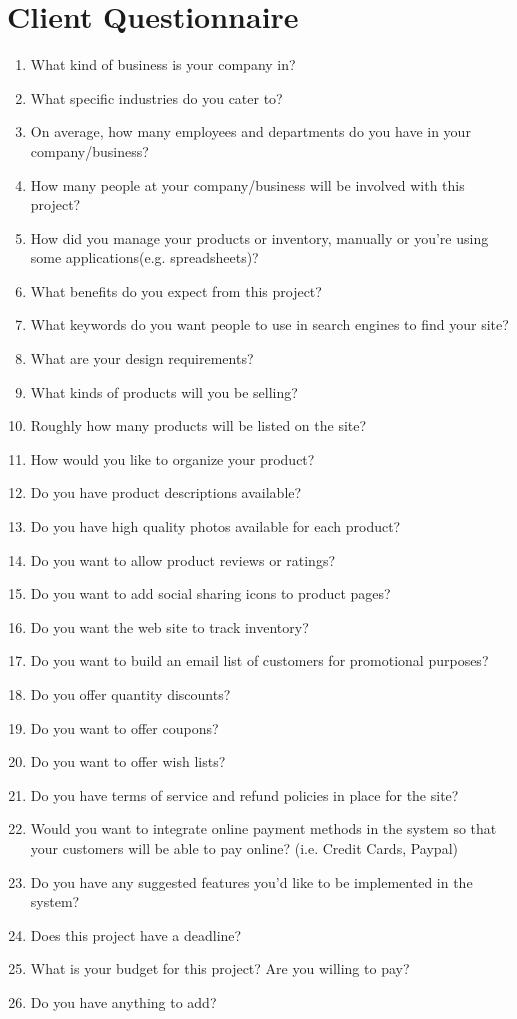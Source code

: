 \documentclass{report}
\begin{document}
\section{Client Questionnaire}
\begin{enumerate}
\item What kind of business is your company in?
\item What specific industries do you cater to?
\item On average, how many employees and departments do you have in your
company/business?
\item How many people at your company/business will be involved with this project?
\item How did you manage your products or inventory, manually or you're using some
applications(e.g. spreadsheets)?
\item What benefits do you expect from this project?
\item What keywords do you want people to use in search engines to find your site?
\item What are your design requirements?
\item What kinds of products will you be selling?
\item Roughly how many products will be listed on the site?
\item How would you like to organize your product?
\item Do you have product descriptions available?
\item Do you have high quality photos available for each product?
\item Do you want to allow product reviews or ratings?
\item Do you want to add social sharing icons to product pages?
\item Do you want the web site to track inventory?
\item Do you want to build an email list of customers for promotional purposes?
\item Do you offer quantity discounts?
\item Do you want to offer coupons?
\item Do you want to offer wish lists?
\item Do you have terms of service and refund policies in place for the site?
\item Would you want to integrate online payment methods in the system so that your
customers will be able to pay online? (i.e. Credit Cards, Paypal)
\item Do you have any suggested features you’d like to be implemented in the system?
\item Does this project have a deadline?
\item What is your budget for this project? Are you willing to pay?
\item Do you have anything to add?
\end{enumerate}
\end{document}
